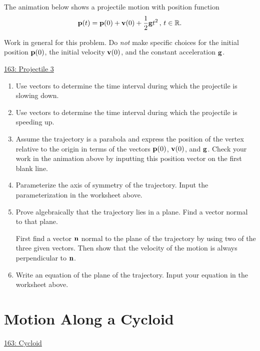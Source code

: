 \documentclass{ximera}
\begin{document}
\begin{question}  \label{Q454rft4t4t}
The animation below shows a projectile motion with position function
\[
    {\bf p}(t) = {\bf p}(0) + {\bf v}(0) + \frac{1}{2}{\bf g}t^2 \, , \, t \in \mathbb{R} .
\]

Work in general for this problem. Do \emph{not} make specific choices for the initial position ${\bf p}(0)$, the initial velocity ${\bf v}(0)$, and the constant acceleration ${\bf g}$. 

\begin{onlineOnly}
    \begin{center}
\end{center}
\end{onlineOnly}

\href{https://www.desmos.com/3d/clr4mdmltt}{163: Projectile 3}

\begin{enumerate}
\item Use vectors to determine the time interval during which the projectile is slowing down. 

\item Use vectors to determine the time interval during which the projectile is speeding up. 

\item Assume the trajectory is a parabola and express the position of the vertex relative to the origin in terms of the vectors ${\bf p}(0)$, ${\bf v}(0)$, and ${\bf g}$. Check  your work in the animation above by inputting this position vector on the first blank line.

\item Parameterize the axis of symmetry of the trajectory. Input the parameterization in the worksheet above.

\item Prove algebraically that the trajectory lies in a plane. Find a vector normal to that plane.

\begin{hint}
First find a vector ${\bf n}$ normal to the plane of the trajectory by using two of the three given vectors. Then show that the velocity of the motion is always perpendicular to ${\bf n}$.
\end{hint}


\item Write an equation of the plane of the trajectory. Input your equation in the worksheet above.

\end{enumerate}
\end{question}

\section{Motion Along a Cycloid}
\begin{question} \label{Q4950504333}

\begin{onlineOnly}
    \begin{center}
\end{center}
\end{onlineOnly}

\href{https://www.geogebra.org/classic/rrzgbtfr}{163: Cycloid}
\end{question}
\end{document}
